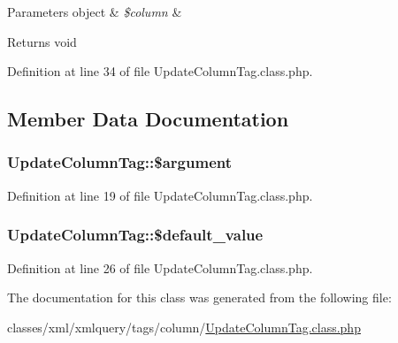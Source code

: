 \begin{DoxyParams}[1]{Parameters}
object & {\em \$column} & \\
\hline
\end{DoxyParams}
\begin{DoxyReturn}{Returns}
void 
\end{DoxyReturn}


Definition at line 34 of file Update\-Column\-Tag.\-class.\-php.



\subsection{Member Data Documentation}
\hypertarget{classUpdateColumnTag_a3312163ccabc7246e2f397390648b75b}{
\subsubsection[{\$argument}]{\setlength{\rightskip}{0pt plus 5cm}Update\-Column\-Tag\-::\$argument}}\label{classUpdateColumnTag_a3312163ccabc7246e2f397390648b75b}


Definition at line 19 of file Update\-Column\-Tag.\-class.\-php.

\hypertarget{classUpdateColumnTag_a63420aa5c0b8c374a4f29d054abbda76}{
\subsubsection[{\$default\-\_\-value}]{\setlength{\rightskip}{0pt plus 5cm}Update\-Column\-Tag\-::\$default\-\_\-value}}\label{classUpdateColumnTag_a63420aa5c0b8c374a4f29d054abbda76}


Definition at line 26 of file Update\-Column\-Tag.\-class.\-php.



The documentation for this class was generated from the following file\-:\begin{DoxyCompactItemize}
\item 
classes/xml/xmlquery/tags/column/\hyperlink{UpdateColumnTag_8class_8php}{Update\-Column\-Tag.\-class.\-php}\end{DoxyCompactItemize}

